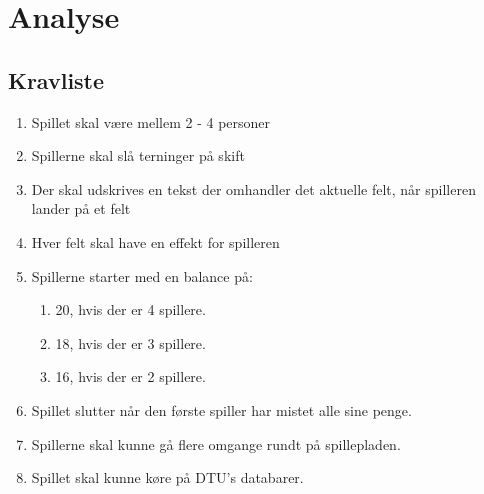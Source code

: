 \section{Analyse}
        
    
    \subsection{Kravliste}
        \begin{enumerate}
            \item Spillet skal være mellem 2 - 4 personer
            \item Spillerne skal slå terninger på skift
            \item Der skal udskrives en tekst der omhandler det aktuelle felt, når spilleren lander på et felt
            \item Hver felt skal have en effekt for spilleren
            \item Spillerne starter med en balance på:
            \begin{enumerate}
                \item 20, hvis der er 4 spillere.
                \item 18, hvis der er 3 spillere.
                \item 16, hvis der er 2 spillere.
            \end{enumerate}
            \item Spillet slutter når den første spiller har mistet alle sine penge.
            \item Spillerne skal kunne gå flere omgange rundt på spillepladen.
            \item Spillet skal kunne køre på DTU’s databarer.
        \end{enumerate}



\pagebreak
